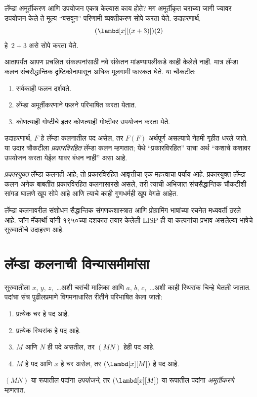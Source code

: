 लॅम्डा अमूर्तीकरण आणि उपयोजन एकत्र केल्यास काय होते? मग अमूर्तीकृत
चराच्या जागी ज्यावर उपयोजन केले ते मूल्य “बसवून” परिणामी
व्यक्तीकरण सोपे करता येते. उदाहरणार्थ,
\[(\lambd[x][(x + 3)])(2)
\]
हे~$2 + 3$ असे सोपे करता येते.

आतापर्यंत आपण प्रचलित संकल्पनांसाठी नवे संकेतन मांडण्यापलीकडे काही
केलेले नाही. मात्र लॅम्डा कलन संचसैद्धान्तिक दृष्टिकोनापासून अधिक
मूलगामी फारकत घेते. या चौकटीत:
\begin{enumerate}
\item सर्वकाही फलन दर्शवते.
\item लॅम्डा अमूर्तीकरणाने फलने परिभाषित करता येतात.
\item कोणत्याही गोष्टीचे इतर कोणत्याही गोष्टीवर उपयोजन करता येते.
\end{enumerate}
उदाहरणार्थ, $F$ हे लॅम्डा कलनातील पद असेल, तर $F(F)$ अर्थपूर्ण
असल्याचे नेहमी गृहीत धरले जाते. या उदार चौकटीला
\emph{प्रकारविरहित} लॅम्डा कलन म्हणतात; येथे “प्रकारविरहित” याचा अर्थ
“कशाचे कशावर उपयोजन करता येईल यावर बंधन नाही” असा आहे.

\begin{digress}
\emph{प्रकारयुक्त} लॅम्डा कलनही आहे; तो प्रकारविरहित आवृत्तीचा
एक महत्त्वाचा पर्याय आहे. प्रकारयुक्त लॅम्डा कलन अनेक बाबतींत
प्रकारविरहित कलनासारखे असले, तरी त्याची अभिजात संचसैद्धान्तिक
चौकटीशी सांगड घालणे खूप सोपे आहे आणि त्याचे काही गुणधर्मही
खूप वेगळे आहेत.

लॅम्डा कलनावरील संशोधन सैद्धान्तिक संगणकशास्त्रात आणि
प्रोग्रामिंग भाषांच्या रचनेत मध्यवर्ती ठरले आहे. जॉन मॅकार्थी
यांनी १९५०च्या दशकात तयार केलेली LISP ही या कल्पनांचा
प्रभाव असलेल्या भाषेचे सुरुवातीचे उदाहरण आहे.
\end{digress}











\section{लॅम्डा कलनाची विन्यासमीमांसा}\label{lam:int:syn:sec}

सुरुवातीला $x$, $y$, $z$,~\dots अशी चरांची मालिका आणि $a$, $b$,
$c$,~\dots अशी काही स्थिरांक चिन्हे घेतली जातात. पदांचा संच पुढीलप्रमाणे
विगमनाधारित रीतीने परिभाषित केला जातो:
\begin{enumerate}
\item प्रत्येक चर हे पद आहे.
\item प्रत्येक स्थिरांक हे पद आहे.
\item $M$ आणि $N$ ही पदे असतील, तर $(MN)$ हेही पद आहे.
\item $M$ हे पद आणि $x$ हे चर असेल, तर $(\lambd[x][M])$ हे
  पद आहे.
\end{enumerate}
$(MN)$ या रूपातील पदांना \emph{उपयोजने}, तर $(\lambd[x][M])$
या रूपातील पदांना \emph{अमूर्तीकरणे} म्हणतात.

